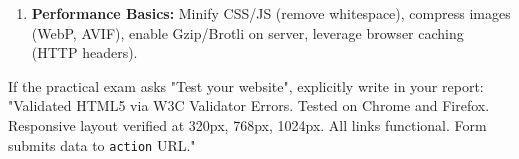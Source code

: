 \documentclass[11pt]{article}
\begin{document}
\begin{methode}
\begin{enumerate}
\begin{itemize}
            \item Static hosting: GitHub Pages, Netlify, Vercel (free, HTTPS automatic).
            \item Traditional: FTP/SFTP to \texttt{public\_html} or \texttt{www} on a LAMP server (CAMTEL, MTN Business, or private hosting).
            \item Domain: \texttt{.cm} (managed by ANTIC), \texttt{.com}, \texttt{.org}. DNS: A record (IP), CNAME (alias).
        \end{itemize}
    \item \textbf{Performance Basics:} Minify CSS/JS (remove whitespace), compress images (WebP, AVIF), enable Gzip/Brotli on server, leverage browser caching (HTTP headers).
\end{enumerate}
\begin{aretenir}
If the practical exam asks "Test your website", explicitly write in your report: "Validated HTML5 via W3C Validator  Errors. Tested on Chrome and Firefox. Responsive layout verified at 320px, 768px, 1024px. All links functional. Form submits data to \texttt{action} URL."
\end{aretenir}
\end{methode}
\end{document}
